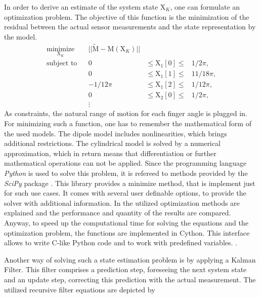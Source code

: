 In order to derive an estimate of the system state $ \mathrm{X}_K $, one can formulate an optimization problem. The objective of this function is the minimization of the residual between the actual sensor measurements and the state representation by the model. 
\begin{equation}
\begin{aligned}
\underset{\mathrm{X}_K}{\text{minimize}} & & || \tilde{\mathrm{M}} - \mathrm{M}(\mathrm{X}_K) ||\\
\text{subject to} & & 0 & \leq \mathrm{X}_1[0] \leq & 1/2 \pi, \\ 
				  & & 0 & \leq \mathrm{X}_1[1]  \leq & 11/18 \pi, \\
				  & & -1/12 \pi & \leq \mathrm{X}_1[2] \leq & 1/12 \pi, \\
				  & & 0 & \leq \mathrm{X}_2[0]  \leq & 1/2 \pi, \\
				  & & \vdots
\end{aligned}
\end{equation}
As constraints, the natural range of motion for each finger angle is plugged in. For minimizing such a function, one has to remember the mathematical form of the used models. The dipole model includes nonlinearities, which brings additional restrictions. The cylindrical model is solved by a numerical approximation, which in return means that differentiation or further mathematical operations can not be applied. Since the programming language \emph{Python} is used to solve this problem, it is refereed to methods provided by the \emph{SciPy} package . This library provides a minimize method, that is implement just for such use cases. It comes with several user definable options, to provide the solver with additional information. In  the utilized optimization methods are explained and the performance and quantity of the results are compared. Anyway, to speed up the computational time for solving the equations and the optimization problem, the functions are implemented in Cython. This interface allows to write C-like Python code and to work with predefined variables. .

Another way of solving such a state estimation problem is by applying a Kalman Filter. This filter comprises a prediction step, foreseeing the next system state and an update step, correcting this prediction with the actual measurement. The utilized recursive filter equations are depicted by

